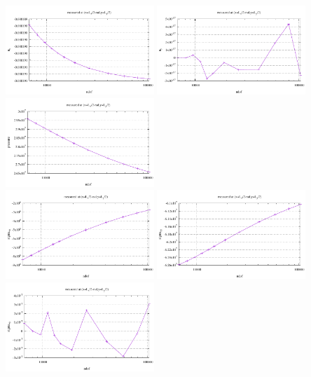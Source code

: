 \begin{center}
\includegraphics[width=5.6cm]{python_codes/fieldstone_124/results/exp1/west_ux}
\includegraphics[width=5.6cm]{python_codes/fieldstone_124/results/exp1/west_uy}
\includegraphics[width=5.6cm]{python_codes/fieldstone_124/results/exp1/west_p}\\
\includegraphics[width=5.6cm]{python_codes/fieldstone_124/results/exp1/west_sigmaxx}
\includegraphics[width=5.6cm]{python_codes/fieldstone_124/results/exp1/west_sigmayy}
\includegraphics[width=5.6cm]{python_codes/fieldstone_124/results/exp1/west_sigmaxy}\\

\end{center}
